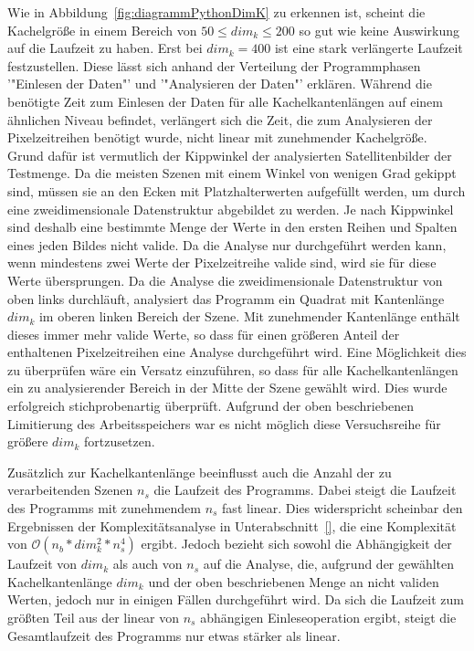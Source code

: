 Wie in Abbildung~\ref{fig:diagrammPythonDimK} zu erkennen ist, scheint die Kachelgröße in einem Bereich von $50 \leq dim_k \leq 200$ so gut wie keine Auswirkung auf die Laufzeit zu haben. Erst bei $dim_k = 400$ ist eine stark verlängerte Laufzeit festzustellen. Diese lässt sich anhand der Verteilung der Programmphasen '"Einlesen der Daten"' und '"Analysieren der Daten"' erklären. Während die benötigte Zeit zum Einlesen der Daten für alle Kachelkantenlängen auf einem ähnlichen Niveau befindet, verlängert sich die Zeit, die zum Analysieren der Pixelzeitreihen benötigt wurde, nicht linear mit zunehmender Kachelgröße. Grund dafür ist vermutlich der Kippwinkel der analysierten Satellitenbilder der Testmenge. Da die meisten Szenen mit einem Winkel von wenigen Grad gekippt sind, müssen sie an den Ecken mit Platzhalterwerten aufgefüllt werden, um durch eine zweidimensionale Datenstruktur abgebildet zu werden. Je nach Kippwinkel sind deshalb eine bestimmte Menge der Werte in den ersten Reihen und Spalten eines jeden Bildes nicht valide. Da die Analyse nur durchgeführt werden kann, wenn mindestens zwei Werte der Pixelzeitreihe valide sind, wird sie für diese Werte übersprungen. Da die Analyse die zweidimensionale Datenstruktur von oben links durchläuft, analysiert das Programm ein Quadrat mit Kantenlänge $dim_k$ im oberen linken Bereich der Szene. Mit zunehmender Kantenlänge enthält dieses immer mehr valide Werte, so dass für einen größeren Anteil der enthaltenen Pixelzeitreihen eine Analyse durchgeführt wird. Eine Möglichkeit dies zu überprüfen wäre ein Versatz einzuführen, so dass für alle Kachelkantenlängen ein zu analysierender Bereich in der Mitte der Szene gewählt wird. Dies wurde erfolgreich stichprobenartig überprüft. Aufgrund der oben beschriebenen Limitierung des Arbeitsspeichers war es nicht möglich diese Versuchsreihe für größere $dim_k$ fortzusetzen.

Zusätzlich zur Kachelkantenlänge beeinflusst auch die Anzahl der zu verarbeitenden Szenen $n_s$ die Laufzeit des Programms. Dabei steigt die Laufzeit des Programms mit zunehmendem $n_s$ fast linear. Dies widerspricht scheinbar den Ergebnissen der Komplexitätsanalyse in Unterabschnitt~\ref{}, die eine Komplexität von $\mathcal{O}(n_b * dim_k^2 * n_s^4)$ ergibt. Jedoch bezieht sich sowohl die Abhängigkeit der Laufzeit von $dim_k$ als auch von $n_s$ auf die Analyse, die, aufgrund der gewählten Kachelkantenlänge $dim_k$ und der oben beschriebenen Menge an nicht validen Werten, jedoch nur in einigen Fällen durchgeführt wird. Da sich die Laufzeit zum größten Teil aus der linear von $n_s$ abhängigen Einleseoperation ergibt, steigt die Gesamtlaufzeit des Programms nur etwas stärker als linear.

